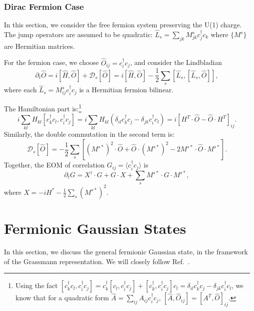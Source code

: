 \documentclass[aps,prx,superscriptaddress,nofootinbib]{revtex4}
\begin{document}
\subsubsection{Dirac Fermion Case}

In this section, we consider the free fermion system preserving the U(1) charge. The jump operators are assumed to be quadratic: $\hat L_s = \sum_{jk} M^s_{jk} c_j^\dagger c_k$ where $\{M^s\}$ are Hermitian matrices.

For the fermion case, we choose $\hat O_{ij} = c_i^\dagger c_j$, and consider the Lindbladian
$$
	\partial_t \hat O = i[\hat H, \hat O] + \mathcal D_s[\hat O]
	= i[\hat H, \hat O] - \frac{1}{2} \sum_s [\hat L_s,[\hat L_s,\hat O]],
$$
where each $\hat L_s = M^s_{ij} c_i^\dagger c_j$ is a Hermitian fermion bilinear.


The Hamiltonian part is:\footnote{Using the fact
$[c_k^\dagger c_l, c_i^\dagger c_j] = c_k^\dagger[c_l,c_i^\dagger c_j] + [c_k^\dagger,c_i^\dagger c_j]c_l =\delta_{il}c_k^\dagger c_j -\delta_{jk}c_i^\dagger c_l$, we know that for a quadratic form $\hat A = \sum_{ij} A_{ij} c_i^\dagger c_j$, $[\hat A, \hat O_{ij}] = [A^T, \hat O]_{ij}$.}
$$
	i \sum_{kl}H_{kl}[c_k^\dagger c_l, c_i^\dagger c_j]
	= i \sum_{kl} H_{kl} (\delta_{il}c_k^\dagger c_j -\delta_{jk}c_i^\dagger c_l)
	= i [H^T\cdot \hat O - \hat O\cdot H^T]_{ij}.
$$
Similarly, the double commutation in the second term is:
$$
	\mathcal D_s[\hat O]
	= -\frac{1}{2}\sum_s [(M^{s*})^2\cdot\hat O + \hat O\cdot (M^{s*})^2 - 2 M^{s*}\cdot \hat O \cdot M^{s*}].
$$
Together, the EOM of correlation $G_{ij} = \langle c_i^\dagger c_j\rangle$ is
\begin{equation}
	\partial_t G = X^\dagger \cdot G + G \cdot X + \sum_s M^{s*}\cdot G \cdot M^{s*},
\end{equation}
where $X = -i H^* - \frac{1}{2}\sum_s (M^{s*})^2$.



\section{Fermionic Gaussian States}

In this section, we discuss the general fermionic Gaussian state, in the framework of the Grassmann representation.
We will closely follow Ref.~\cite{bravyi2004lagrangian}.
\end{document}

